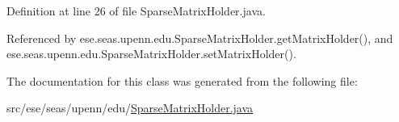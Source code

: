 Definition at line 26 of file Sparse\+Matrix\+Holder.\+java.



Referenced by ese.\+seas.\+upenn.\+edu.\+Sparse\+Matrix\+Holder.\+get\+Matrix\+Holder(), and ese.\+seas.\+upenn.\+edu.\+Sparse\+Matrix\+Holder.\+set\+Matrix\+Holder().



The documentation for this class was generated from the following file\+:\begin{DoxyCompactItemize}
\item 
src/ese/seas/upenn/edu/\hyperlink{_sparse_matrix_holder_8java}{Sparse\+Matrix\+Holder.\+java}\end{DoxyCompactItemize}
